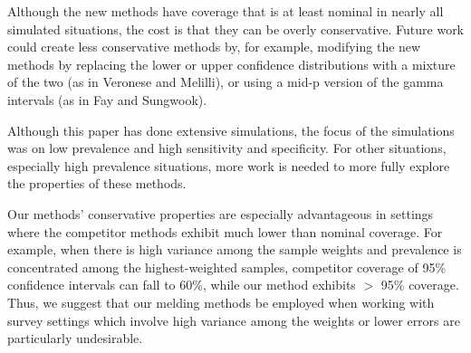 Although the new methods have coverage that is at least nominal in nearly all simulated situations, the cost is that they can be overly conservative.
Future work could create less conservative methods by, for example, modifying the new methods by replacing the lower or upper confidence distributions with a mixture of the two (as in Veronese and Melilli\cite{veronese2015}), or using a mid-p version of the gamma intervals (as in Fay and Sungwook\cite{FayK:2017}).

Although this paper has done extensive simulations, the focus of the simulations was on low prevalence and high
sensitivity and specificity. For other situations, especially high prevalence situations, more work is needed to more fully explore the properties of these methods.

Our methods' conservative properties are especially advantageous in settings where the competitor methods exhibit much lower than nominal coverage.
For example, when there is high variance among the sample weights and prevalence is concentrated among the highest-weighted samples, competitor coverage of 95\% confidence intervals can fall to 60\%, while our method exhibits \( > \) 95\% coverage.
Thus, we suggest that our melding methods be employed when working with survey settings which involve high variance among the weights or lower errors are particularly undesirable.

